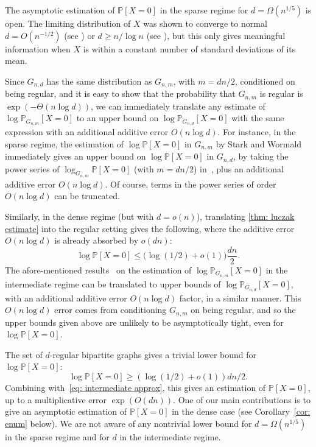 \documentclass[11pt]{article}
\def\P{\mathbb P}
\theoremstyle{plain}
\begin{document}
The asymptotic estimation of $\P[X=0]$ in the sparse regime for $d=\Omega(n^{1/5})$ is open. The limiting distribution of $X$ was shown to converge to normal $d = O(n^{-1/2})$ (see \cite{Gao2024,GaoWormald2008}) or $d \geq n/\log n$ (see \cite{Sah_Sawhney_2023}), but this only gives meaningful information when $X$ is within a constant number of standard deviations of its mean.


Since $G_{n,d}$ has the same distribution as $G_{n,m}$, with $m=dn/2$, conditioned on being regular, and it is easy to show that the probability that $G_{n,m}$ is regular is $\exp(-\Theta(n\log d))$, we can immediately translate any estimate of $\log\P_{G_{n,m}}[X=0]$ to an upper bound on $\log\P_{G_{n,d}}[X=0]$ with the same expression with an additional additive error $O(n\log d)$. For instance,
in the sparse regime, the estimation of $\log\P[X=0]$ in $G_{n,m}$ by Stark and Wormald~\cite{STARK_WORMALD_2018} immediately gives an upper bound on $\log\P[X=0]$  in $G_{n,d}$, by taking 
the power series of $\log_{G_{n,m}} \P[X=0]$ (with $m=dn/2$) in~\cite{STARK_WORMALD_2018}, plus an additional additive error $O(n\log d)$. Of course, terms in the power series of order  $O(n\log d)$ can be truncated.


Similarly, in the dense regime (but with $d=o(n)$), translating \cref{thm: luczak estimate} into the regular setting gives the following, where the additive error $O(n\log d)$ is already absorbed by $o(dn)$:
    \begin{equation}\label{eq: intermediate approx}
        \log\P[X = 0] \leq \big(\log(1/2)+o(1)\big) \frac{dn}{2}.
    \end{equation}
The afore-mentioned results~\cite{JENSSEN2025110499, jenssen2024lower} on the estimation of $\log \P_{G_{n,m}}[X=0]$ in the intermediate regime can  be translated to upper bounds of $\log \P_{G_{n,d}}[X=0]$, with an additional additive error $O(n\log d)$ factor, in a similar manner.
This $O(n\log d)$ error comes from conditioning $G_{n,m}$ on being regular, and so the upper bounds given above are unlikely to be asymptotically tight, even  for $\log \P[X=0]$.




The set of $d$-regular bipartite graphs
gives a trivial lower bound for $\log \P[X=0]$:
\[
\log \P[X=0] \ge (\log(1/2)+o(1)) dn/2.
\]
Combining with~\eqref{eq: intermediate approx}, this gives an estimation of $\P[X=0]$, up to a multiplicative error $\exp(O(dn))$. One of our main contributions is to give an asymptotic 
estimation of $\P[X=0]$ in the dense case (see Corollary~\ref{cor: enum} below). 
We are not aware of any nontrivial lower bound for $d=\Omega(n^{1/5})$ in the sparse regime and for $d$ in the intermediate regime. 
\end{document}
